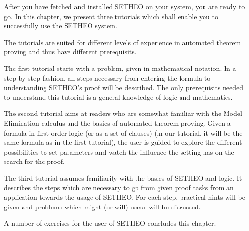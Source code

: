 %

%
After you have fetched and installed SETHEO on your system,
you are ready to go.
In this chapter, we present three tutorials which shall enable you to
successfully use the SETHEO system.

The tutorials are suited for different levels of experience in
automated theorem proving and thus have  different prerequisits.

The first tutorial starts with a problem, given in mathematical
notation. In a step by step fashion, all steps necessary from entering
the formula to understanding SETHEO's proof will be described.
The only prerequisits needed to understand this tutorial is a general
knowledge of logic and mathematics.

The second tutorial aims at readers who are somewhat familiar 
with the Model Elimination calculus and the basics of automated theorem
proving. Given a formula in first order logic (or as a set of clauses)
(in our tutorial, it will be the same formula as in the first tutorial),
the user is guided to explore the different possibilities to set
parameters and watch the influence the setting has on the search
for the proof.

The third tutorial assumes familiarity with the basics of SETHEO
and logic. It describes the steps which are necessary to go from
given proof tasks from an application towards the usage of SETHEO.
For each step, practical hints will be given and problems which might
(or will) occur will be discussed.

A number of exercises for the user of SETHEO concludes this chapter.
